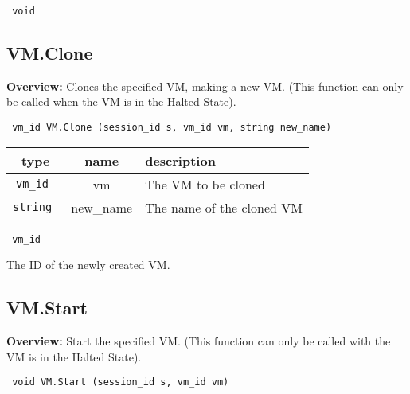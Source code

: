 \vspace{0.3cm}

{\tt 
void
}



\vspace{0.3cm}
\vspace{0.3cm}
\vspace{0.3cm}

\subsection{VM.Clone}

{\bf Overview:} 
Clones the specified VM, making a new VM.
        (This function can only be called when the VM is in the Halted State).

\begin{verbatim} vm_id VM.Clone (session_id s, vm_id vm, string new_name)\end{verbatim}



 
\vspace{0.3cm}
\begin{tabular}{|c|c|p{7cm}|}
 \hline
{\bf type} & {\bf name} & {\bf description} \\ \hline
{\tt vm\_id } & vm & The VM to be cloned \\ \hline 

{\tt string } & new\_name & The name of the cloned VM \\ \hline 

\end{tabular}

\vspace{0.3cm}

{\tt 
vm\_id
}


The ID of the newly created VM.
\vspace{0.3cm}
\vspace{0.3cm}
\vspace{0.3cm}

\subsection{VM.Start}

{\bf Overview:} 
Start the specified VM.
        (This function can only be called with the VM is in the Halted State).

\begin{verbatim} void VM.Start (session_id s, vm_id vm)\end{verbatim}


